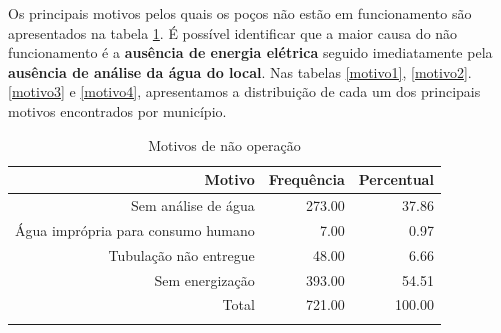 \documentclass[a4paper, 12pt, openright, oneside, english, brazil, article]{abntex2}
\begin{document}
	Os principais motivos pelos quais os poços não estão em funcionamento são apresentados na tabela \ref{mot-nao-operacao}. É possível identificar que a maior causa do não funcionamento é a \textbf{ausência de energia elétrica} seguido imediatamente pela \textbf{ausência de análise da água do local}. Nas tabelas \ref{motivo1}, \ref{motivo2}. \ref{motivo3} e \ref{motivo4}, apresentamos a distribuição de cada um dos principais motivos encontrados por município.
	
	
	
	\begin{scriptsize}
		\begin{longtable}{rrr}
			\caption{Motivos de não operação} \\ 
			\hline
			Motivo & Frequência & Percentual \\ 
			\hline
			Sem análise de água & 273.00 & 37.86 \\ 
			Água imprópria para consumo humano & 7.00 & 0.97 \\ 
			Tubulação não entregue & 48.00 & 6.66 \\ 
			Sem energização & 393.00 & 54.51 \\ 
			\hline
			Total & 721.00 & 100.00 \\ 
			\hline
			\hline
			\label{mot-nao-operacao}
		\end{longtable}
	\end{scriptsize}
	
	
	
\end{document}
